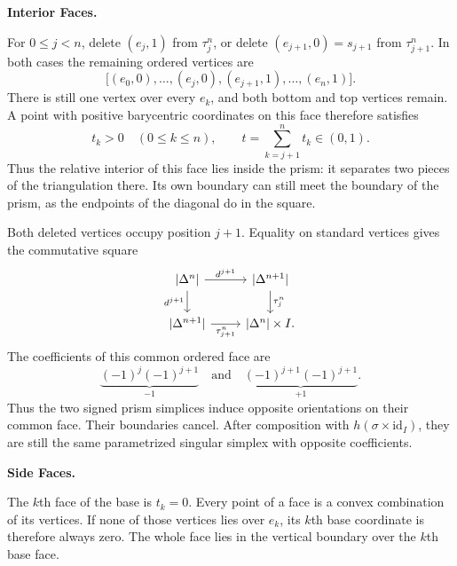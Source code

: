 \documentclass[11pt]{article}
\newcommand{\facecase}[1]{\par\Needspace{4\baselineskip}\smallskip\textbf{#1.}\par}
\begin{document}
\facecase{Interior Faces}
For $0\le j<n$, delete $(e_j,1)$ from $\tau_j^n$, or delete $(e_{j+1},0)=s_{j+1}$ from $\tau_{j+1}^n$. In both cases the remaining ordered vertices are
\[
\bigl[(e_0,0),\ldots,(e_j,0),(e_{j+1},1),\ldots,(e_n,1)\bigr].
\]
There is still one vertex over every $e_k$, and both bottom and top vertices remain. A point with positive barycentric coordinates on this face therefore satisfies
\[
t_k>0\quad(0\le k\le n),\qquad
t=\sum_{k=j+1}^n t_k\in(0,1).
\]
Thus the relative interior of this face lies inside the prism: it separates two pieces of the triangulation there. Its own boundary can still meet the boundary of the prism, as the endpoints of the diagonal do in the square.

Both deleted vertices occupy position $j+1$. Equality on standard vertices gives the commutative square
\begin{equation*}\label{diag:interior}
\begin{tikzcd}
\lvert\Delta^n\rvert\arrow[r,"d^{j+1}"]\arrow[d,"d^{j+1}"']&
\lvert\Delta^{n+1}\rvert\arrow[d,"\tau_j^n"]\\
\lvert\Delta^{n+1}\rvert\arrow[r,"\tau_{j+1}^n"']&
\lvert\Delta^n\rvert\times I.
\end{tikzcd}
\end{equation*}
The coefficients of this common ordered face are
\[
\underbrace{(-1)^j(-1)^{j+1}}_{-1}
\quad\text{and}\quad
\underbrace{(-1)^{j+1}(-1)^{j+1}}_{+1}.
\]
Thus the two signed prism simplices induce opposite orientations on their common face. Their boundaries cancel. After composition with $h(\sigma\times\mathrm{id}_I)$, they are still the same parametrized singular simplex with opposite coefficients.

\facecase{Side Faces}
The $k$th face of the base is $t_k=0$. Every point of a face is a convex combination of its vertices. If none of those vertices lies over $e_k$, its $k$th base coordinate is therefore always zero. The whole face lies in the vertical boundary over the $k$th base face.
\end{document}
